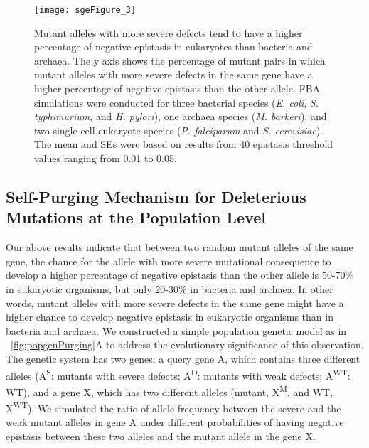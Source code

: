 \begin{figure}
\centering
\texttt{[image: sgeFigure\_3]}
\caption{Mutant alleles with more severe defects tend to have a higher
percentage of negative epistasis in eukaryotes than bacteria and
archaea. The y axis shows the percentage of mutant pairs in which
mutant alleles with more severe defects in the same gene have a higher
percentage of negative epistasis than the other allele. FBA
simulations were conducted for three bacterial species
(\textit{E. coli}, \textit{S. typhimurium}, and \textit{H. pylori}),
one archaea species (\textit{M. barkeri}), and two single-cell
eukaryote species (\textit{P. falciparum} and
\textit{S. cerevisiae}). The mean and SEs were based on results from
40 epistasis threshold values ranging from 0.01 to 0.05.}
\label{fig:speciesPurging}
\end{figure}

\subsection{Self-Purging Mechanism for Deleterious Mutations at the
Population Level}

Our above results indicate that between two random mutant alleles of
the same gene, the chance for the allele with more severe mutational
consequence to develop a higher percentage of negative epistasis than
the other allele is 50-70\% in eukaryotic organisms, but only 20-30\% in
bacteria and archaea. In other words, mutant alleles with more severe
defects in the same gene might have a higher chance to develop
negative epistasis in eukaryotic organisms than in bacteria and
archaea. We constructed a simple population genetic model as in
\Fig~\ref{fig:popgenPurging}A to address the evolutionary significance of this
observation. The genetic system has two genes: a query gene A, which
contains three different alleles (A\textsuperscript{S}: mutants with
severe defects; A\textsuperscript{D}: mutants with weak defects;
A\textsuperscript{WT}: WT), and a gene X, which has two different
alleles (mutant, X\textsuperscript{M}, and WT,
X\textsuperscript{WT}). We simulated the ratio of allele frequency
between the severe and the weak mutant alleles in
gene A under different probabilities of having negative epistasis
between these two alleles and the mutant allele in the gene X.

